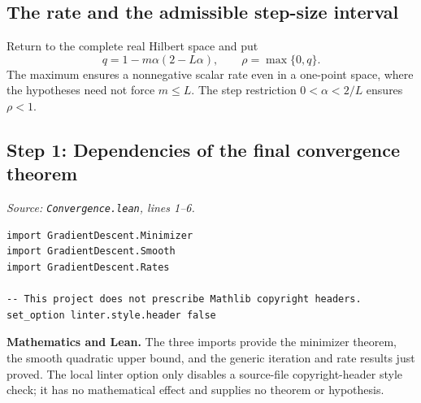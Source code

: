 \documentclass[11pt,a4paper]{article}
\newcommand{\lean}[1]{\ifmmode\text{\nolinkurl{#1}}\else\nolinkurl{#1}\fi}
\newenvironment{proofstep}{%
 \begin{lrbox}{\proofstepbox}\begin{minipage}{\linewidth}%
}{%
 \end{minipage}\end{lrbox}%
 \par\Needspace{\dimexpr\ht\proofstepbox+\dp\proofstepbox+8pt\relax}%
 \noindent\usebox{\proofstepbox}\par\medskip%
}
\begin{document}
\begin{proofstep}

\section{The rate and the admissible step-size interval}

Return to the complete real Hilbert space and put
\[
q=1-m\alpha(2-L\alpha),\qquad\rho=\max\{0,q\}.
\]
The maximum ensures a nonnegative scalar rate even in a one-point space, where the hypotheses need not force $m\le L$. The step restriction $0<\alpha<2/L$ ensures $\rho<1$.

\subsection*{Step 1: Dependencies of the final convergence theorem}

\textit{Source: \lean{Convergence.lean}, lines 1--6.}
\begin{lstlisting}[style=leanproof,firstnumber=1]
import GradientDescent.Minimizer
import GradientDescent.Smooth
import GradientDescent.Rates

-- This project does not prescribe Mathlib copyright headers.
set_option linter.style.header false
\end{lstlisting}


\textbf{Mathematics and Lean.} The three imports provide the minimizer theorem, the smooth quadratic upper bound, and the generic iteration and rate results just proved. The local linter option only disables a source-file copyright-header style check; it has no mathematical effect and supplies no theorem or hypothesis.

\end{proofstep}
\end{document}
